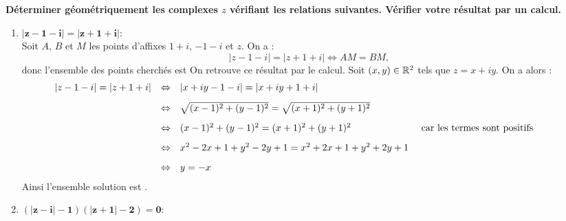\documentclass[a4paper, 11pt]{article}
\begin{document}
\begin{correction}  \;
	\textbf{D\'eterminer g\'eom\'etriquement les complexes $z$ v\'erifiant les relations suivantes. V\'erifier votre r\'esultat par un calcul.}
	\begin{enumerate}
		\item $\mathbf{|z-1-i| = |z+1+i|}$:\\
		      Soit $A$, $B$ et $M$ les points d'affixes $1+i$, $-1-i$ et $z$. On a :
		      $$|z-1-i| = |z+1+i| \Leftrightarrow AM=BM,$$
		      donc l'ensemble des points cherch\'es est 
		      \hspace*{0.5cm}
		      \noindent On retrouve ce r\'esultat par le calcul. Soit $(x,y)\in \mathbb{R}^2$ tels que $z=x+iy$. On a alors :
		      $$\hspace*{-1cm}\begin{array}{rcll}
				      |z-1-i| = |z+1+i| & \Leftrightarrow & |x+iy-1-i| = |x+iy+1+i|\vsec                                                                         \\
				                        & \Leftrightarrow & \sqrt{(x-1)^2+(y-1)^2} =  \sqrt{(x+1)^2+(y+1)^2}\vsec                                                \\
				                        & \Leftrightarrow & (x-1)^2+(y-1)^2 = (x+1)^2+(y+1)^2                     & \textmd{ car les termes sont positifs }\vsec \\
				                        & \Leftrightarrow & x^2-2x+1+y^2-2y+1 = x^2+2x +1 +y^2+2y+1\vsec                                                         \\
				                        & \Leftrightarrow & y =-x
			      \end{array}$$
		      Ainsi l'ensemble solution est .
		\item $\mathbf{(|z-i|-1)(|z+1|-2)=0}$:\\

\end{enumerate}
\end{correction}
\end{document}

